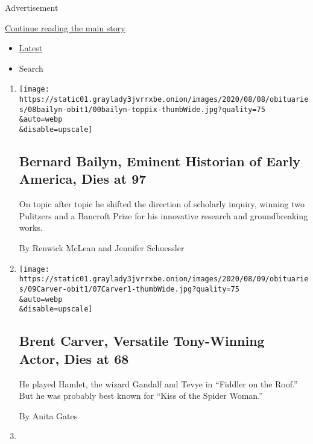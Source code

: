 Advertisement

\protect\hyperlink{after-mid1}{Continue reading the main story}

\begin{itemize}
\tightlist
\item
  \protect\hyperlink{stream-panel}{Latest}
\item
  Search
\end{itemize}

\begin{enumerate}
\def\labelenumi{\arabic{enumi}.}
\item
  \href{/2020/08/07/books/bernard-bailyn-dead.html}{}

  \texttt{[image: https://static01.graylady3jvrrxbe.onion/images/2020/08/08/obituaries/08bailyn-obit1/00bailyn-toppix-thumbWide.jpg?quality=75\\\&auto=webp\\\&disable=upscale]}

  \hypertarget{bernard-bailyn-eminent-historian-of-early-america-dies-at-97}{%
  \subsection{Bernard Bailyn, Eminent Historian of Early America, Dies
  at
  97}\label{bernard-bailyn-eminent-historian-of-early-america-dies-at-97}}

  On topic after topic he shifted the direction of scholarly inquiry,
  winning two Pulitzers and a Bancroft Prize for his innovative research
  and groundbreaking works.

  By Renwick McLean and Jennifer Schuessler
\item
  \href{/2020/08/07/theater/brent-carver-dead.html}{}

  \texttt{[image: https://static01.graylady3jvrrxbe.onion/images/2020/08/09/obituaries/09Carver-obit1/07Carver1-thumbWide.jpg?quality=75\\\&auto=webp\\\&disable=upscale]}

  \hypertarget{brent-carver-versatile-tony-winning-actor-dies-at-68}{%
  \subsection{Brent Carver, Versatile Tony-Winning Actor, Dies at
  68}\label{brent-carver-versatile-tony-winning-actor-dies-at-68}}

  He played Hamlet, the wizard Gandalf and Tevye in ``Fiddler on the
  Roof.'' But he was probably best known for ``Kiss of the Spider
  Woman.''

  By Anita Gates
\item
  \href{/2020/08/07/t-magazine/akeem-smith-art.html}{}


\end{enumerate}
